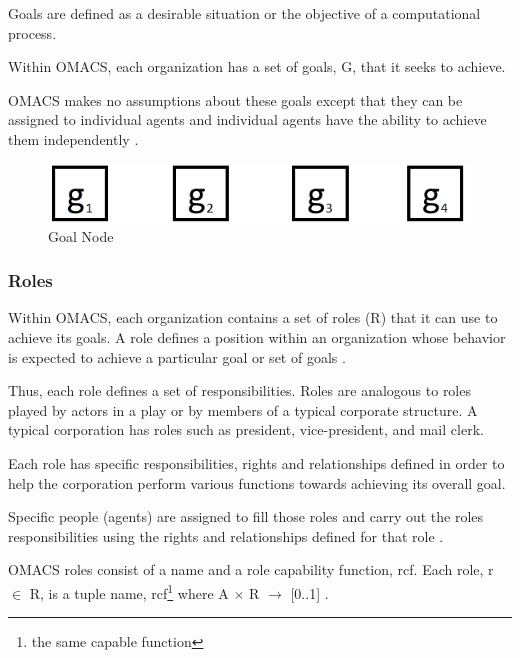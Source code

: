 Goals are defined as a desirable situation or the objective of a
computational process.

Within OMACS, each organization has a set of goals, G, that it seeks
to achieve.

OMACS makes no assumptions about these goals except that they can be assigned to
individual agents and individual agents have the ability to achieve them independently \cite{omacs2}.
\hspace{1cm}
\begin{figure}[th]
	\centering
		\includegraphics[scale=0.5]{ch1/img/goals}
	\caption{\label{fig:Goal Node}Goal Node }
\end{figure}
\hspace{1cm}
\subsubsection{Roles} 

Within OMACS, each organization contains a set of roles (R) that it can use to achieve its goals.
A role defines a position within an organization whose behavior is expected to achieve a
particular goal or set of goals \cite{omacs2}.

Thus, each role defines a set of responsibilities. Roles are
analogous to roles played by actors in a play or by members of a typical corporate structure. A
typical corporation has roles such as president, vice-president, and mail clerk. 

Each role has specific responsibilities, rights and relationships defined in order to help the corporation
perform various functions towards achieving its overall goal. 

Specific people (agents) are assigned to fill those roles and carry out the roles responsibilities using the rights and
relationships defined for that role \cite{omacs2}.

OMACS roles consist of a name and a role capability function, rcf. Each role, r $\in$ R, is a tuple
\textlangle{} name, rcf\footnote{the same capable function} \textrangle{} where A $\times$ R $\rightarrow$ {[}0..1{]} .


